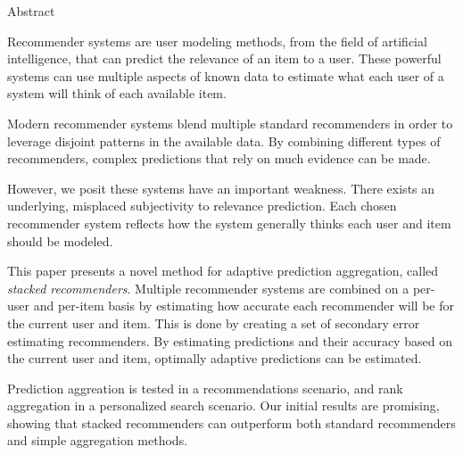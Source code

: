 \null\vspace{4em}
{
  \centering
  \normalfont
  \huge
  Abstract\\
}
\vspace{2em}

Recommender systems are user modeling methods,
from the field of artificial intelligence,
that can predict the relevance of an item to a user.
These powerful systems can use multiple aspects of known data
to estimate what each user of a system will think of each available item.

Modern recommender systems blend multiple standard recommenders
in order to leverage disjoint patterns in the available data.
By combining different types of recommenders,
complex predictions that rely on much evidence can be made.

However, we posit these systems have an important weakness.
There exists an underlying, misplaced subjectivity to relevance prediction.
Each chosen recommender system reflects how the system
generally thinks each user and item should be modeled.

This paper presents a novel method for adaptive prediction aggregation,
called \emph{stacked recommenders}.
Multiple recommender systems are combined on a per-user and per-item basis
by estimating how accurate each recommender will be for the current user and item.
This is done by creating a set of secondary error estimating recommenders.
By estimating predictions and their accuracy based 
on the current user and item,
optimally adaptive predictions can be estimated.

Prediction aggreation is tested in a recommendations scenario,
and rank aggregation in a personalized search scenario.
Our initial results are promising, showing that stacked recommenders
can outperform both standard recommenders and simple aggregation methods.

\clearpage
